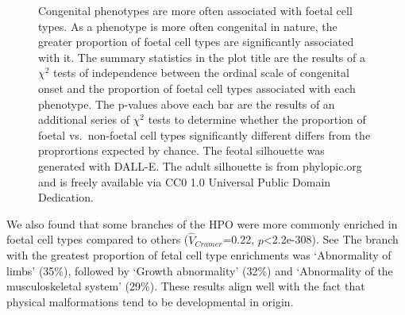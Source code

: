 \documentclass[
]{article}
\begin{document}
\label{cell-fig-congenital}
\begin{figure}[H]


\caption{\label{fig-congenital}Congenital phenotypes are more often
associated with foetal cell types. As a phenotype is more often
congenital in nature, the greater proportion of foetal cell types are
significantly associated with it. The summary statistics in the plot
title are the results of a \(\chi^2\) tests of independence between the
ordinal scale of congenital onset and the proportion of foetal cell
types associated with each phenotype. The p-values above each bar are
the results of an additional series of \(\chi^2\) tests to determine
whether the proportion of foetal vs.~non-foetal cell types significantly
different differs from the proprortions expected by chance. The feotal
silhouette was generated with DALL-E. The adult silhouette is from
phylopic.org and is freely available via CC0 1.0 Universal Public Domain
Dedication.}

\end{figure}%

We also found that some branches of the HPO were more commonly enriched
in foetal cell types compared to others (\(\hat{V}_{Cramer}\)=0.22,
\(p\)\textless2.2e-308). See The branch with the greatest proportion of
fetal cell type enrichments was `Abnormality of limbs' (35\%), followed
by `Growth abnormality' (32\%) and `Abnormality of the musculoskeletal
system' (29\%). These results align well with the fact that physical
malformations tend to be developmental in origin.
\end{document}
